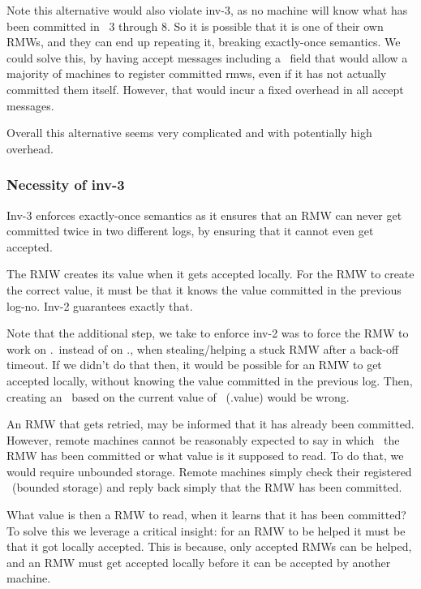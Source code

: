 Note this alternative would also violate inv-3, as no machine will know what has been committed in \lognos~3 through 8. So it is possible that it is one of their own RMWs, and they can end up repeating it, breaking exactly-once semantics.
We could solve this, by having accept messages including a \regedrmw~field that would allow a majority of machines to register committed rmws, even if it has not actually committed them itself. However, that would incur a fixed overhead in all accept messages.

Overall this alternative seems very complicated and with potentially high overhead.



\subsubsection{Necessity of inv-3}\label{sec:cor:inv3-nec}

\custvspace
{}
Inv-3 enforces exactly-once semantics as it ensures that an RMW can never get committed twice in two different logs, by ensuring that it cannot even get accepted.

\custvspace
{}
The RMW creates its value when it gets accepted locally.
For the RMW to create the correct value, it must be that it knows the value committed in the previous log-no. Inv-2 guarantees exactly that.

Note that the additional step, we take to enforce inv-2 was to force the RMW to work on \kv.\comlogno\ instead of on \kv.\logno, when stealing/helping a stuck RMW after a back-off timeout. If we didn't do that then, it would be possible for an RMW to get accepted locally, without knowing the value committed in the previous log. Then, creating an \accval\ based on the current value of \kv~(\ie \kv.value) would be wrong.


\custvspace
{}
An RMW that gets retried, may be informed that it has already been committed. 
However, remote machines cannot be reasonably expected to say in which \logno\ the RMW has been committed or what value is it supposed to read. To do that, we would require unbounded storage.
Remote machines simply check their registered \rmws\ (bounded storage) and reply back simply that the RMW has been committed.

What value is then a RMW to read, when it learns that it has been committed?
To solve this we leverage a critical insight: for an RMW to be helped it must be that it got locally accepted. This is because, only accepted RMWs can be helped, and an RMW must get accepted locally before it can be accepted by another machine.

